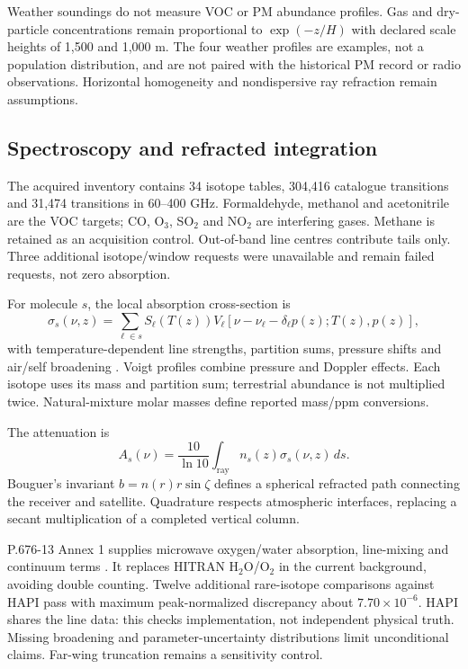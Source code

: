 \documentclass[conference]{IEEEtran}
\begin{document}
Weather soundings do not measure VOC or PM abundance profiles. Gas and dry-particle concentrations remain proportional to $\exp(-z/H)$ with declared scale heights of 1,500 and 1,000 m. The four weather profiles are examples, not a population distribution, and are not paired with the historical PM record or radio observations. Horizontal homogeneity and nondispersive ray refraction remain assumptions.

\subsection{Spectroscopy and refracted integration}
The acquired inventory contains 34 isotope tables, 304,416 catalogue transitions and 31,474 transitions in 60--400 GHz. Formaldehyde, methanol and acetonitrile are the VOC targets; CO, O$_3$, SO$_2$ and NO$_2$ are interfering gases. Methane is retained as an acquisition control. Out-of-band line centres contribute tails only. Three additional isotope/window requests were unavailable and remain failed requests, not zero absorption.

For molecule $s$, the local absorption cross-section is
\begin{equation}
\sigma_s(\nu,z)=\sum_{\ell\in s} S_\ell(T(z))
V_\ell[\nu-\nu_\ell-\delta_\ell p(z);T(z),p(z)],
\end{equation}
with temperature-dependent line strengths, partition sums, pressure shifts and air/self broadening \cite{hitran,hapi}. Voigt profiles combine pressure and Doppler effects. Each isotope uses its mass and partition sum; terrestrial abundance is not multiplied twice. Natural-mixture molar masses define reported mass/ppm conversions.

The attenuation is
\begin{equation}
A_s(\nu)=\frac{10}{\ln10}\int_{\mathrm{ray}}n_s(z)\sigma_s(\nu,z)\,ds.
\end{equation}
Bouguer's invariant $b=n(r)r\sin\zeta$ defines a spherical refracted path connecting the receiver and satellite. Quadrature respects atmospheric interfaces, replacing a secant multiplication of a completed vertical column.

P.676-13 Annex 1 supplies microwave oxygen/water absorption, line-mixing and continuum terms \cite{itu676}. It replaces HITRAN H$_2$O/O$_2$ in the current background, avoiding double counting. Twelve additional rare-isotope comparisons against HAPI pass with maximum peak-normalized discrepancy about $7.70\times10^{-6}$. HAPI shares the line data: this checks implementation, not independent physical truth. Missing broadening and parameter-uncertainty distributions limit unconditional claims. Far-wing truncation remains a sensitivity control.
\end{document}
